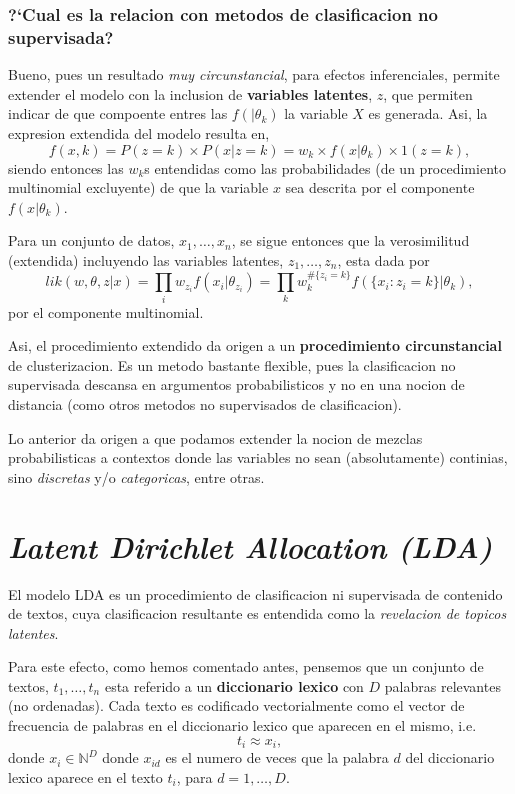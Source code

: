 \documentclass[11pt,]{article}
\begin{document}
\subsubsection{?`Cual es la relacion con metodos de clasificacion no
supervisada?}\label{cual-es-la-relacion-con-metodos-de-clasificacion-no-supervisada}

Bueno, pues un resultado \emph{muy circunstancial}, para efectos
inferenciales, permite extender el modelo con la inclusion de
\textbf{variables latentes}, \(z\), que permiten indicar de que
compoente entres las \(f(|\theta_k)\) la variable \(X\) es generada.
Asi, la expresion extendida del modelo resulta en, \[
f(x,k)=P(z=k)\times P(x|z=k)= w_k \times f(x|\theta_k) \times 1(z=k),
\] siendo entonces las \(w_k\)s entendidas como las probabilidades (de
un procedimiento multinomial excluyente) de que la variable \(x\) sea
descrita por el componente \(f(x|\theta_k)\).

Para un conjunto de datos, \(x_1,\ldots,x_n\), se sigue entonces que la
verosimilitud (extendida) incluyendo las variables latentes,
\(z_1,\ldots,z_n\), esta dada por \[
lik(w,\theta,z|x)=\prod_{i}w_{z_i}f(x_i|\theta_{z_i})=\prod_k w_{k}^{\#\{z_i=k\}}f(\{x_i:z_i=k\}|\theta_k),
\] por el componente multinomial.

Asi, el procedimiento extendido da origen a un \textbf{procedimiento
circunstancial} de clusterizacion. Es un metodo bastante flexible, pues
la clasificacion no supervisada descansa en argumentos probabilisticos y
no en una nocion de distancia (como otros metodos no supervisados de
clasificacion).

Lo anterior da origen a que podamos extender la nocion de mezclas
probabilisticas a contextos donde las variables no sean (absolutamente)
continias, sino \emph{discretas} y/o \emph{categoricas}, entre otras.

\section{\texorpdfstring{\emph{Latent Dirichlet Allocation
(LDA)}}{Latent Dirichlet Allocation (LDA)}}\label{latent-dirichlet-allocation-lda}

El modelo LDA es un procedimiento de clasificacion ni supervisada de
contenido de textos, cuya clasificacion resultante es entendida como la
\emph{revelacion de topicos latentes}.

Para este efecto, como hemos comentado antes, pensemos que un conjunto
de textos, \(t_1,\ldots,t_n\) esta referido a un \textbf{diccionario
lexico} con \(D\) palabras relevantes (no ordenadas). Cada texto es
codificado vectorialmente como el vector de frecuencia de palabras en el
diccionario lexico que aparecen en el mismo, i.e. \[
t_i \approx x_i,
\] donde \(x_i \in \mathbb{N}^{D}\) donde \(x_{id}\) es el numero de
veces que la palabra \(d\) del diccionario lexico aparece en el texto
\(t_i\), para \(d=1,\ldots,D\).
\end{document}
